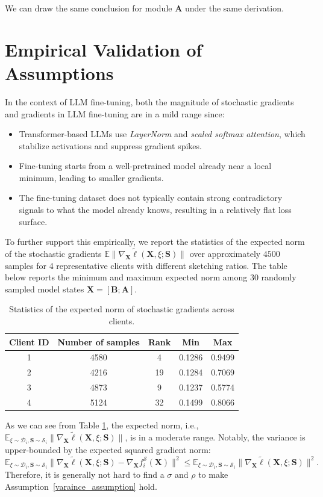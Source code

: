 \documentclass{article} %
\theoremstyle{plain}
\theoremstyle{definition}
\begin{document}
We can draw the same conclusion for module $\mathbf{A}$ under the same derivation.


\section{Empirical Validation of Assumptions}\label{appen:justification_assumption}

In the context of LLM fine-tuning, both the magnitude of stochastic gradients and gradients in LLM fine-tuning are in a mild range since:
\begin{itemize}[leftmargin=*]
    \item Transformer-based LLMs use \emph{LayerNorm} and \emph{scaled softmax attention}, which stabilize activations and suppress gradient spikes.
    \item Fine-tuning starts from a well-pretrained model already near a local minimum, leading to smaller gradients.
    \item The fine-tuning dataset does not typically contain strong contradictory signals to what the model already knows, resulting in a relatively flat loss surface. 
\end{itemize}

To further support this empirically, we report the statistics of the expected norm of the stochastic gradients 
$\mathbb{E}\|\nabla_{\mathbf{X}} \tilde{\ell}(\mathbf{X},\xi;\mathbf{S})\|$ 
over approximately $4500$ samples for 4 representative clients with different sketching ratios. The table below reports the minimum and maximum expected norm among 30 randomly sampled model states $\mathbf{X} = [\mathbf{B}; \mathbf{A}]$.

\begin{table}[h!]
\caption{Statistics of the expected norm of stochastic gradients across clients.\label{tab:gradient_norm}}
\centering
\small
\begin{tabular}{ccccc}
\toprule
\textbf{Client ID} & \textbf{Number of samples} & \textbf{Rank} & \textbf{Min} & \textbf{Max} \\
\midrule
1 & 4580 & 4  & 0.1286 & 0.9499 \\
2 & 4216 & 19 & 0.1284 & 0.7069 \\
3 & 4873 & 9  & 0.1237 & 0.5774 \\
4 & 5124 & 32 & 0.1499 & 0.8066 \\
\bottomrule
\end{tabular}
\end{table}


As we can see from Table \ref{tab:gradient_norm}, the expected norm, i.e., $\mathbb{E}_{\xi \sim \mathcal{D}_i, \mathbf{S}\sim \mathcal{S}_i}\|\nabla_{\mathbf{X}} \tilde{\ell}(\mathbf{X},\xi;\mathbf{S})\|$, is in a moderate range. Notably, the variance is upper-bounded by the expected squared gradient norm:
\[
\mathbb{E}_{\xi \sim \mathcal{D}_i, \mathbf{S}\sim \mathcal{S}_i} \|\nabla_{\mathbf{X}} \tilde{\ell}(\mathbf{X},\xi;\mathbf{S}) - \nabla_{\mathbf{X}} f_i^{\mathcal{S}}(\mathbf{X})\|^2 
\leq \mathbb{E}_{\xi \sim \mathcal{D}_i, \mathbf{S}\sim \mathcal{S}_i}\|\nabla_{\mathbf{X}} \tilde{\ell}(\mathbf{X},\xi;\mathbf{S})\|^2.
\]
Therefore, it is generally not hard to find a $\sigma$ and $\rho$ to make Assumption~\ref{varaince_assumption} hold.
\end{document}
